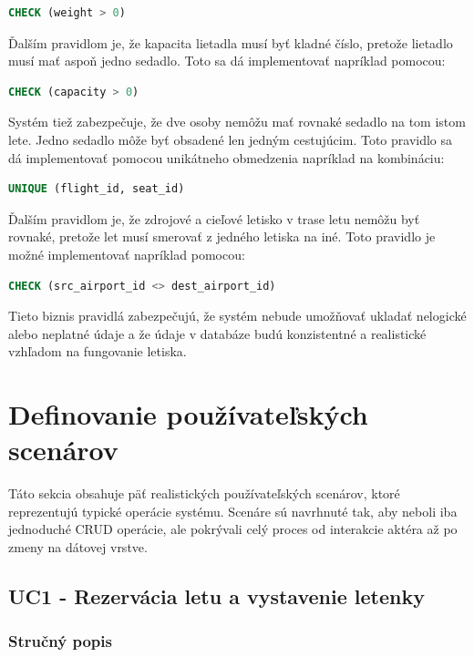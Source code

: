 \documentclass[11pt, a4paper]{article}
\begin{document}
\begin{lstlisting}[language=SQL]
CHECK (weight > 0)
\end{lstlisting}

Ďalším pravidlom je, že kapacita lietadla musí byť kladné číslo, pretože
lietadlo musí mať aspoň jedno sedadlo. Toto sa dá implementovať napríklad
pomocou:

\begin{lstlisting}[language=SQL]
CHECK (capacity > 0)
\end{lstlisting}

Systém tiež zabezpečuje, že dve osoby nemôžu mať rovnaké sedadlo na tom istom
lete. Jedno sedadlo môže byť obsadené len jedným cestujúcim. Toto pravidlo sa
dá implementovať pomocou unikátneho obmedzenia napríklad na kombináciu:

\begin{lstlisting}[language=SQL]
UNIQUE (flight_id, seat_id)
\end{lstlisting}

Ďalším pravidlom je, že zdrojové a cieľové letisko v trase letu nemôžu byť
rovnaké, pretože let musí smerovať z jedného letiska na iné. Toto pravidlo je
možné implementovať napríklad pomocou:

\begin{lstlisting}[language=SQL]
CHECK (src_airport_id <> dest_airport_id)
\end{lstlisting}

Tieto biznis pravidlá zabezpečujú, že systém nebude umožňovať ukladať
nelogické alebo neplatné údaje a že údaje v databáze budú konzistentné a
realistické vzhľadom na fungovanie letiska.


\section{Definovanie používateľských scenárov}
\label{sec:usecase}

Táto sekcia obsahuje päť realistických používateľských scenárov, ktoré
reprezentujú typické operácie systému. Scenáre sú navrhnuté tak, aby neboli
iba jednoduché CRUD operácie, ale pokrývali celý proces od interakcie aktéra až
po zmeny na dátovej vrstve.

\subsection{UC1 - Rezervácia letu a vystavenie letenky}

\subsubsection*{Stručný popis}
\end{document}
